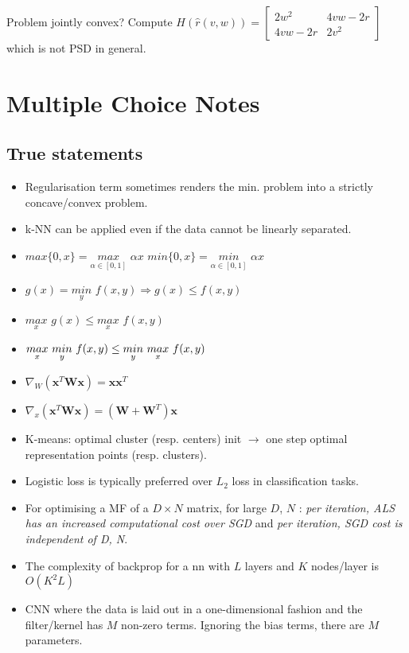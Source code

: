 Problem jointly convex? Compute $H(\hat{r}({v,w})) = \begin{bmatrix} 2w^2 & 4vw-2r \\ 4vw-2r & 2v^2 \end{bmatrix}$ which is not PSD in general.


\section{Multiple Choice Notes}
\subsection{True statements}
\begin{itemize}
\item Regularisation term sometimes renders the min. problem into a strictly concave/convex problem.
\item k-NN can be applied even if the data cannot be linearly separated.
\item $max\{ 0, x\} = \underset{{\alpha \in [0,1]}}{max} \,\, \alpha x$ \newline $min\{ 0, x\} = \underset{{\alpha \in [0,1]}}{min}\,\,  \alpha x$
\item $g(x) = \underset{y}{min}\,\, f(x,y) \Rightarrow g(x) \le f(x,y)$
\item $\underset{x}{max}\,\, g(x) \le \underset{x}{max} \,\,f(x,y)$ \newline
\item $\underset{x}{max} \,\, \underset{y}{min} \,\, f(x,y) \newline \le \underset{y}{min} \,\, \underset{x}{max} \,\, f(x,y)$\newline
\item $\nabla_{W} (\mathbf{x}^T\mathbf{W}\mathbf{x}) = \mathbf{x}\mathbf{x}^T$
\item $\nabla_{x} (\mathbf{x}^T\mathbf{W}\mathbf{x}) = (\mathbf{W}+\mathbf{W}^T)\mathbf{x}$
\item K-means: optimal cluster (resp. centers) init $\rightarrow$ one step optimal representation points (resp. clusters).
\item Logistic loss is typically preferred over $L_2$ loss in classification tasks.
\item For optimising a MF of a $D\times N$ matrix, for large $D$, $N$ : \textit{per iteration, ALS has an increased computational cost over SGD} and \textit{per iteration, SGD cost is independent of D, N}.
\item The complexity of backprop for a nn with $L$ layers and $K$ nodes/layer is $O(K^2L)$
\item CNN where the data is laid out in a one-dimensional fashion and the filter/kernel has $M$ non-zero terms. Ignoring the bias terms, there are $M$ parameters.
\end{itemize}


